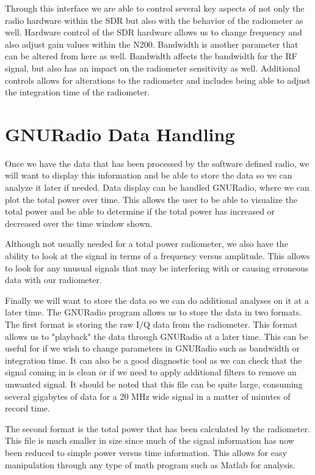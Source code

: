 Through this interface we are able to control several key aspects of not only the radio hardware within the SDR but also with the behavior of the radiometer as well.  Hardware control of the SDR hardware allows us to change frequency and also adjust gain values within the N200.  Bandwidth is another parameter that can be altered from here as well.  Bandwidth affects the bandwidth for the RF signal, but also has an impact on the radiometer sensitivity as well.  Additional controls allows for alterations to the radiometer and includes being able to adjust the integration time of the radiometer.  

\section{GNURadio Data Handling}
Once we have the data that has been processed by the software defined radio, we will want to display this information and be able to store the data so we can analyze it later if needed.  Data display can be handled GNURadio, where we can plot the total power over time.  This allows the user to be able to visualize the total power and be able to determine if the total power has increased or decreased over the time window shown.  

Although not usually needed for a total power radiometer, we also have the ability to look at the signal in terms of a frequency versus amplitude.  This allows to look for any unusual signals that may be interfering with or causing erroneous data with our radiometer.  

Finally we will want to store the data so we can do additional analyses on it at a later time.  The GNURadio program allows us to store the data in two formats.  The first format is storing the raw I/Q data from the radiometer.  This format allows us to "playback" the data through GNURadio at a later time.  This can be useful for if we wish to change parameters in GNURadio such as bandwidth or integration time.  It can also be a good diagnostic tool as we can check that the signal coming in is clean or if we need to apply additional filters to remove an unwanted signal. It should be noted that this file can be quite large, consuming several gigabytes of data for a 20 MHz wide signal in a matter of minutes of record time.

The second format is the total power that has been calculated by the radiometer.  This file is much smaller in size since much of the signal information has now been reduced to simple power versus time information.  This allows for easy manipulation through any type of math program such as Matlab for analysis.  


